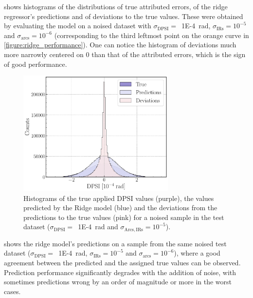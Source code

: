  shows histograms of the distributions of true attributed errors, of the ridge regressor's predictions and of deviations to the true values.
These were obtained by evaluating the model on a noised dataset with \(\sigma_{\mathrm{DPSI}} =\)~\qty{1E-4}{\radian}, \(\sigma_{\mathrm{IRs}} = 10^{-5}\) and \(\sigma_{\mathrm{arcs}} = 10^{-6}\) (corresponding to the third leftmost point on the \textcolor{mplorange}{orange} curve in \cref{figure:ridge_performance}).
One can notice the histogram of deviations much more narrowly centered on \num{0} than that of the attributed errors, which is the sign of good performance.

\begin{figure}[!htb]
    \centering
    \includegraphics*[width=0.7\textwidth]{Figures/ML_for_IR_Coupling/ridge_histograms.pdf}
    \caption{Histograms of the true applied \(\mathrm{DPSI}\) values (\textcolor{ridgepurple}{purple}), the values predicted by the Ridge model (\textcolor{ridgeblue}{blue}) and the deviations from the predictions to the true values (\textcolor{ridgesalmon}{pink}) for a noised sample in the test dataset (\(\sigma_{\mathrm{DPSI}} =\)~\qty{1E-4}{\radian} and \(\sigma_{\mathrm{Arcs, IRs}} = 10^{-5}\)).}
    \label{figure:ridge_histograms}
\end{figure}

 shows the ridge model's predictions on a sample from the same noised test dataset (\(\sigma_{\mathrm{DPSI}} =\)~\qty{1E-4}{\radian}, \(\sigma_{\mathrm{IRs}} = 10^{-5}\) and \(\sigma_{\mathrm{arcs}} = 10^{-6}\)), where a good agreement between the predicted and the assigned true values can be observed.
Prediction performance significantly degrades with the addition of noise, with sometimes predictions wrong by an order of magnitude or more in the worst cases.

